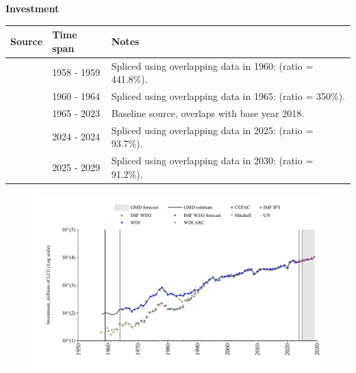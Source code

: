 \documentclass[12pt,a4paper,landscape]{article}
\begin{document}
\begin{adjustbox}{max totalsize={\paperwidth}{\paperheight},center}
\begin{minipage}[t][\textheight][t]{\textwidth}
\vspace*{0.5cm}
{}
\begin{center}
{\Large\bfseries Investment}
\end{center}
\vspace{0.5cm}
\begin{table}[H]
\centering
\small
\begin{tabular}{|l|l|l|}
\hline
\textbf{Source} & \textbf{Time span} & \textbf{Notes} \\
\hline
\rowcolor{white}\cite{Mitchell}& 1958 - 1959 &Spliced using overlapping data in 1960: (ratio = 441.8\%). \\
\rowcolor{lightgray}\cite{WDI_ARC}& 1960 - 1964 &Spliced using overlapping data in 1965: (ratio = 350\%). \\
\rowcolor{white}\cite{WDI}& 1965 - 2023 &Baseline source, overlaps with base year 2018. \\
\rowcolor{lightgray}\cite{IMF_IFS}& 2024 - 2024 &Spliced using overlapping data in 2025: (ratio = 93.7\%). \\
\rowcolor{white}\cite{IMF_WEO_forecast}& 2025 - 2029 &Spliced using overlapping data in 2030: (ratio = 91.2\%). \\
\hline
\end{tabular}
\end{table}
\begin{figure}[H]
\centering
\includegraphics[width=\textwidth,height=0.6\textheight,keepaspectratio]{graphs/SLV_inv.pdf}
\end{figure}
\end{minipage}
\end{adjustbox}
\end{document}
